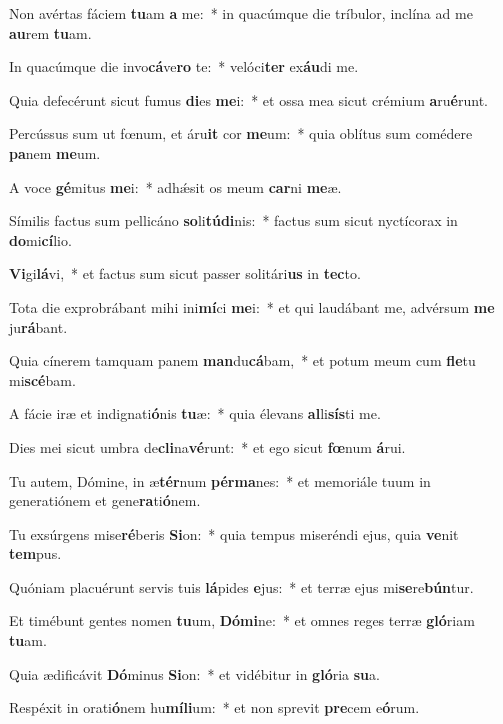 \item Non avértas fáciem \textbf{tu}am \textbf{a} me:~* in quacúmque die tríbulor, inclína ad me \textbf{au}rem \textbf{tu}am.
\item In quacúmque die invo\textbf{cá}ve\textbf{ro} te:~* velóci\textbf{ter} ex\textbf{áu}di me.
\item Quia defecérunt sicut fumus \textbf{di}es \textbf{me}i:~* et ossa mea sicut crémium \textbf{a}ru\textbf{é}runt.
\item Percússus sum ut fœnum, et áru\textbf{it} cor \textbf{me}um:~* quia oblítus sum comédere \textbf{pa}nem \textbf{me}um.
\item A voce \textbf{gé}mitus \textbf{me}i:~* adhǽsit os meum \textbf{car}ni \textbf{me}æ.
\item Símilis factus sum pellicáno \textbf{so}li\textbf{tú}\textbf{di}nis:~* factus sum sicut nyctícorax in \textbf{do}mi\textbf{cí}lio.
\item \textbf{Vi}gi\textbf{lá}vi,~* et factus sum sicut passer solitári\textbf{us} in \textbf{tec}to.
\item Tota die exprobrábant mihi ini\textbf{mí}ci \textbf{me}i:~* et qui laudábant me, advérsum \textbf{me} ju\textbf{rá}bant.
\item Quia cínerem tamquam panem \textbf{man}du\textbf{cá}bam,~* et potum meum cum \textbf{fle}tu mi\textbf{scé}bam.
\item A fácie iræ et indignati\textbf{ó}nis \textbf{tu}æ:~* quia élevans \textbf{al}li\textbf{sís}ti me.
\item Dies mei sicut umbra de\textbf{cli}na\textbf{vé}runt:~* et ego sicut \textbf{fœ}num \textbf{á}rui.
\item Tu autem, Dómine, in æ\textbf{tér}num \textbf{pér}\textbf{ma}nes:~* et memoriále tuum in generatiónem et gene\textbf{ra}ti\textbf{ó}nem.
\item Tu exsúrgens mise\textbf{ré}beris \textbf{Si}on:~* quia tempus miseréndi ejus, quia \textbf{ve}nit \textbf{tem}pus.
\item Quóniam placuérunt servis tuis \textbf{lá}pides \textbf{e}jus:~* et terræ ejus mi\textbf{se}re\textbf{bún}tur.
\item Et timébunt gentes nomen \textbf{tu}um, \textbf{Dó}\textbf{mi}ne:~* et omnes reges terræ \textbf{gló}riam \textbf{tu}am.
\item Quia ædificávit \textbf{Dó}minus \textbf{Si}on:~* et vidébitur in \textbf{gló}ria \textbf{su}a.
\item Respéxit in orati\textbf{ó}nem hu\textbf{mí}\textbf{li}um:~* et non sprevit \textbf{pre}cem e\textbf{ó}rum.
